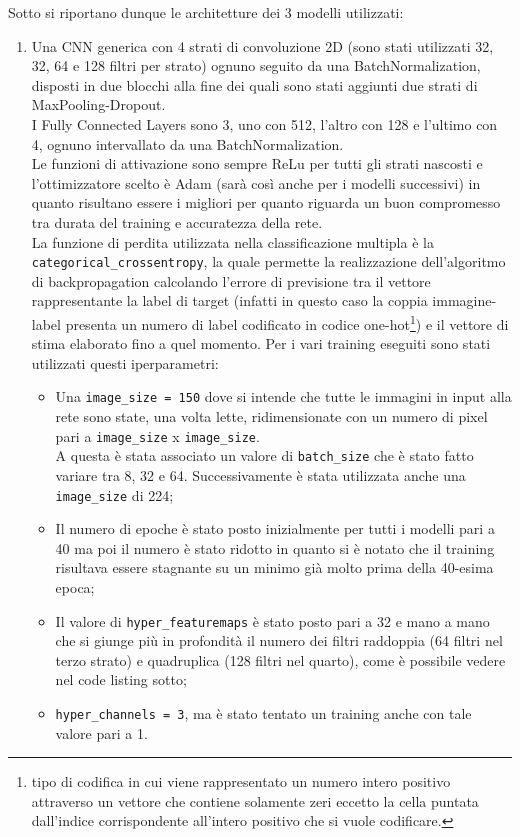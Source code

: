 Sotto si riportano dunque le architetture dei 3 modelli utilizzati:
\begin{enumerate}
    \item Una CNN generica con 4 strati di convoluzione 2D (sono stati utilizzati 32, 32, 64 e 128 filtri per strato) ognuno seguito da una BatchNormalization,
     disposti in due blocchi alla fine dei quali sono stati aggiunti due strati di MaxPooling-Dropout. \\
    I Fully Connected Layers sono 3, uno con 512, l'altro con 128 e l'ultimo con 4, 
    ognuno intervallato da una BatchNormalization. \\
    Le funzioni di attivazione sono sempre ReLu per tutti gli strati nascosti e l'ottimizzatore 
    scelto è Adam (sarà così anche per i modelli successivi) in quanto risultano essere i migliori per quanto riguarda un buon compromesso tra durata del training e accuratezza della rete. \\
    
    La funzione di perdita utilizzata nella classificazione multipla è
     la \lstinline{categorical_crossentropy}, la quale permette la realizzazione
      dell'algoritmo di backpropagation calcolando l'errore di previsione tra il 
      vettore rappresentante la label di target (infatti in questo caso la coppia 
      immagine-label presenta un numero di label codificato in codice 
      one-hot\footnote{tipo di codifica in cui viene rappresentato un numero intero positivo attraverso un vettore che contiene solamente zeri eccetto la cella puntata dall’indice corrispondente all’intero positivo che si vuole codificare.}) e il vettore di stima elaborato fino a quel momento.
  Per i vari training eseguiti sono stati utilizzati questi iperparametri:
  \begin{itemize}
    \item 
  
  Una \lstinline{image_size = 150} dove si intende che tutte le immagini in input alla rete
   sono state, una volta lette, ridimensionate con un numero di pixel pari a \lstinline{image_size} x \lstinline{image_size}. \\
  A questa è stata associato un valore di \lstinline{batch_size} che è stato fatto variare tra 
  8, 32 e 64. Successivamente è stata utilizzata anche una \lstinline{image_size} di 224; 
 \item Il numero di epoche è stato posto inizialmente per tutti i modelli pari a 40 ma poi il numero è stato ridotto in quanto si è notato che il training risultava essere stagnante su un minimo già molto prima della 40-esima epoca; 
\item Il valore di \lstinline{hyper_featuremaps} è stato posto pari a 32 e mano a mano che si giunge più in profondità il numero dei filtri raddoppia (64 filtri nel terzo strato) e 
quadruplica (128 filtri nel quarto), come è possibile vedere nel code listing sotto;
\item \lstinline{hyper_channels = 3}, ma è stato tentato un training anche con tale valore pari a 1. \\


\end{itemize}
\end{enumerate}
